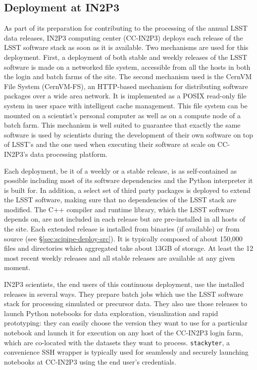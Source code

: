 \subsection{Deployment at IN2P3}

As part of its preparation for contributing to the processing of the annual LSST data releases, IN2P3 computing center (CC-IN2P3) deploys each  release of the LSST software stack as soon as it is  available.
Two mechanisms are used for this deployment. First, a deployment of both stable and weekly releases of the LSST software is made on a networked file system, accessible from all the hosts in both the login and batch farms of the site. The second mechanism used is the CernVM File System (CernVM-FS)\cite{1742-6596-331-4-042003}, an HTTP-based mechanism for distributing software packages over a wide area network. It is implemented as a POSIX read-only file system in user space with intelligent cache management. This file system can be mounted on a scientist's personal computer as well as on a compute node of a batch farm. This mechanism is well suited to guarantee that exactly the same software is used by scientists during the development of their own software on top of LSST's and the one used when executing their software at scale on CC-IN2P3's data processing platform.

\noindent Each deployment, be it of a weekly or a stable release, is as self-contained as possible including most of its software dependencies and the Python interpreter it is built for. In addition, a select set of third party packages is deployed to extend the LSST software, making sure that no dependencies of the LSST stack are modified. The C++ compiler and runtime library, which the LSST software depends on, are not included in each release but are pre-installed in all hosts of the site.
Each extended release is installed from binaries (if available) or from source (see \S\ref{sec:scipipe-deploy-src}). It is typically composed of about 150,000 files and directories which aggregated take about 13GB of storage. At least the 12 most recent weekly releases and all stable releases are available at any given moment.

\noindent IN2P3 scientists, the end users of this continuous deployment, use the installed releases in several ways. They prepare batch jobs which use the LSST software stack for processing simulated or precursor data. They also use those releases to launch Python notebooks for data exploration, visualization and rapid prototyping: they can easily choose the version they want to use for a particular notebook and launch it for execution on any host of the CC-IN2P3 login farm, which are co-located with the datasets they want to process.
\texttt{stackyter}\cite{stackyter}, a convenience SSH wrapper is typically used for seamlessly and securely launching notebooks at CC-IN2P3 using the end user's credentials.

